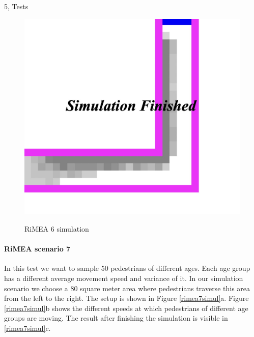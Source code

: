 \begin{task}{5, Tests}
\begin{figure}[H]
{\includegraphics[scale=0.35]{report-template/image/rimea-6-fin.jpeg}}
\caption{RiMEA 6 simulation}
\label{rimea6}
\end{figure}


\paragraph{RiMEA scenario 7}
In this test we want to sample 50 pedestrians of different ages. Each age group has a different average movement speed and variance of it. In our simulation scenario we choose a 80 square meter area where pedestrians traverse this area from the left to the right. The setup is shown in Figure \ref{rimea7simul}a. Figure \ref{rimea7simul}b shows the different speeds at which pedestrians of different age groups are moving. The result after finishing the simulation is visible in \ref{rimea7simul}c.


\end{task}
